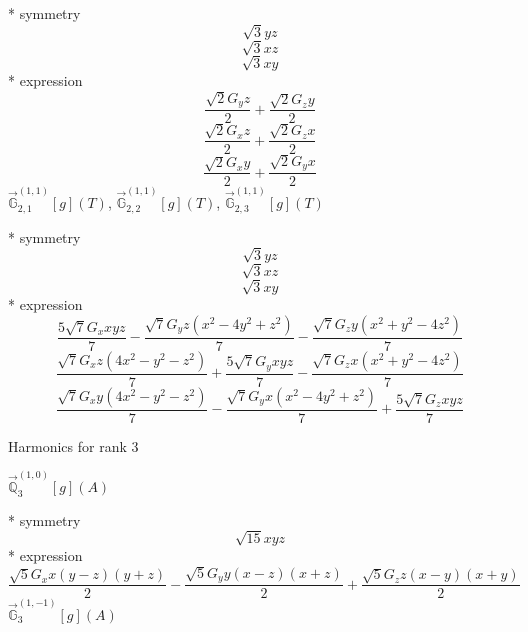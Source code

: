 \documentclass[fleqn,8pt]{jsarticle}
\begin{document}
\noindent\quad ** symmetry
\begin{dmath*}
\sqrt{3} y z
\end{dmath*}
\begin{dmath*}
\sqrt{3} x z
\end{dmath*}
\begin{dmath*}
\sqrt{3} x y
\end{dmath*}
\noindent\quad ** expression
\begin{dmath*}
\frac{\sqrt{2} G_{y} z}{2} + \frac{\sqrt{2} G_{z} y}{2}
\end{dmath*}
\begin{dmath*}
\frac{\sqrt{2} G_{x} z}{2} + \frac{\sqrt{2} G_{z} x}{2}
\end{dmath*}
\begin{dmath*}
\frac{\sqrt{2} G_{x} y}{2} + \frac{\sqrt{2} G_{y} x}{2}
\end{dmath*}
\noindent\quad $\vec{\mathbb{G}}_{2,1}^{(1,1)}[g](T)$, $\vec{\mathbb{G}}_{2,2}^{(1,1)}[g](T)$, $\vec{\mathbb{G}}_{2,3}^{(1,1)}[g](T)$

\noindent\quad ** symmetry
\begin{dmath*}
\sqrt{3} y z
\end{dmath*}
\begin{dmath*}
\sqrt{3} x z
\end{dmath*}
\begin{dmath*}
\sqrt{3} x y
\end{dmath*}
\noindent\quad ** expression
\begin{dmath*}
\frac{5 \sqrt{7} G_{x} x y z}{7} - \frac{\sqrt{7} G_{y} z \left(x^{2} - 4 y^{2} + z^{2}\right)}{7} - \frac{\sqrt{7} G_{z} y \left(x^{2} + y^{2} - 4 z^{2}\right)}{7}
\end{dmath*}
\begin{dmath*}
\frac{\sqrt{7} G_{x} z \left(4 x^{2} - y^{2} - z^{2}\right)}{7} + \frac{5 \sqrt{7} G_{y} x y z}{7} - \frac{\sqrt{7} G_{z} x \left(x^{2} + y^{2} - 4 z^{2}\right)}{7}
\end{dmath*}
\begin{dmath*}
\frac{\sqrt{7} G_{x} y \left(4 x^{2} - y^{2} - z^{2}\right)}{7} - \frac{\sqrt{7} G_{y} x \left(x^{2} - 4 y^{2} + z^{2}\right)}{7} + \frac{5 \sqrt{7} G_{z} x y z}{7}
\end{dmath*}

\noindent * Harmonics for rank 3

\noindent\quad $\vec{\mathbb{Q}}_{3}^{(1,0)}[g](A)$

\noindent\quad ** symmetry
\begin{dmath*}
\sqrt{15} x y z
\end{dmath*}
\noindent\quad ** expression
\begin{dmath*}
\frac{\sqrt{5} G_{x} x \left(y - z\right) \left(y + z\right)}{2} - \frac{\sqrt{5} G_{y} y \left(x - z\right) \left(x + z\right)}{2} + \frac{\sqrt{5} G_{z} z \left(x - y\right) \left(x + y\right)}{2}
\end{dmath*}
\noindent\quad $\vec{\mathbb{G}}_{3}^{(1,-1)}[g](A)$
\end{document}
